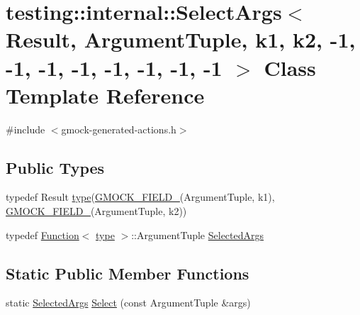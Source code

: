 \hypertarget{classtesting_1_1internal_1_1_select_args_3_01_result_00_01_argument_tuple_00_01k1_00_01k2_00_01-03e4fb75e6504ae34fdb48d64bb6de95}{}\section{testing\+:\+:internal\+:\+:Select\+Args$<$ Result, Argument\+Tuple, k1, k2, -\/1, -\/1, -\/1, -\/1, -\/1, -\/1, -\/1, -\/1 $>$ Class Template Reference}
\label{classtesting_1_1internal_1_1_select_args_3_01_result_00_01_argument_tuple_00_01k1_00_01k2_00_01-03e4fb75e6504ae34fdb48d64bb6de95}


{\ttfamily \#include $<$gmock-\/generated-\/actions.\+h$>$}

\subsection*{Public Types}
\begin{DoxyCompactItemize}
\item 
typedef Result \hyperlink{classtesting_1_1internal_1_1_select_args_3_01_result_00_01_argument_tuple_00_01k1_00_01k2_00_01-03e4fb75e6504ae34fdb48d64bb6de95_a469a6dd6962fc4d816bc1ca254c55d50}{type}(\hyperlink{gmock-generated-actions_8h_a6eb3ce92b0613603057a20ec9e593317}{G\+M\+O\+C\+K\+\_\+\+F\+I\+E\+L\+D\+\_\+}(Argument\+Tuple, k1), \hyperlink{gmock-generated-actions_8h_a6eb3ce92b0613603057a20ec9e593317}{G\+M\+O\+C\+K\+\_\+\+F\+I\+E\+L\+D\+\_\+}(Argument\+Tuple, k2))
\item 
typedef \hyperlink{structtesting_1_1internal_1_1_function}{Function}$<$ \hyperlink{classtesting_1_1internal_1_1_select_args_3_01_result_00_01_argument_tuple_00_01k1_00_01k2_00_01-03e4fb75e6504ae34fdb48d64bb6de95_a469a6dd6962fc4d816bc1ca254c55d50}{type} $>$\+::Argument\+Tuple \hyperlink{classtesting_1_1internal_1_1_select_args_3_01_result_00_01_argument_tuple_00_01k1_00_01k2_00_01-03e4fb75e6504ae34fdb48d64bb6de95_a38c94bd44f857c5e1d4136f7a283e3e1}{Selected\+Args}
\end{DoxyCompactItemize}
\subsection*{Static Public Member Functions}
\begin{DoxyCompactItemize}
\item 
static \hyperlink{classtesting_1_1internal_1_1_select_args_3_01_result_00_01_argument_tuple_00_01k1_00_01k2_00_01-03e4fb75e6504ae34fdb48d64bb6de95_a38c94bd44f857c5e1d4136f7a283e3e1}{Selected\+Args} \hyperlink{classtesting_1_1internal_1_1_select_args_3_01_result_00_01_argument_tuple_00_01k1_00_01k2_00_01-03e4fb75e6504ae34fdb48d64bb6de95_ab9239ba0c8afd6d36332fe5f65f12e5a}{Select} (const Argument\+Tuple \&args)
\end{DoxyCompactItemize}


